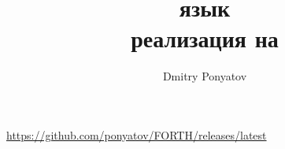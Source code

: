 

\title{\ \\\ \\{\Huge язык \F}\\{\Large реализация на \py}}
\author{Dmitry Ponyatov }


\maketitle
\tableofcontents\secdown
\bigskip
\url{https://github.com/ponyatov/FORTH/releases/latest}









